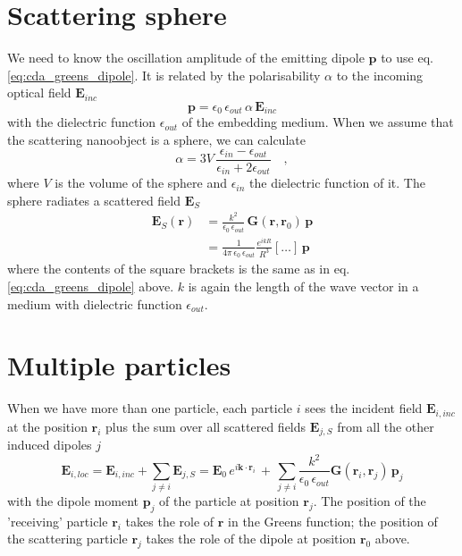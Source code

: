 \section{Scattering sphere}

We need to know the oscillation amplitude of the emitting dipole $\mathbf{p}$ to use eq. \ref{eq:cda_greens_dipole}. It is related by the  polarisability $\alpha$  to the incoming optical field $\mathbf{E}_{inc}$
\begin{equation}
\mathbf{p} = \epsilon_0 \, \epsilon_{out} \, \alpha \, \mathbf{E}_{inc}
\end{equation}
with the dielectric function $\epsilon_{out}$ of the embedding medium. 
When we assume that the scattering nanoobject is a sphere, we can calculate
\begin{equation}
 \alpha = 3V \, \frac{\epsilon_{in} - \epsilon_{out}}{\epsilon_{in} + 2 \epsilon_{out}} \quad ,
\end{equation}
where $V$ is the volume of the sphere and  $\epsilon_{in}$ the dielectric function of it. 
The sphere  radiates a scattered field $\mathbf{E}_S$
\begin{align}
\mathbf{E}_S(\mathbf{r}) & =  \frac{k^2}{\epsilon_0 \, \epsilon_{out}} \, \mathbf{G}(\mathbf{r}, \mathbf{r}_0) \,  \mathbf{p} \\
 & =  \frac{1}{4 \pi \, \epsilon_0 \, \epsilon_{out}  }  \frac{e^{i k R} }{  R^3 } 
\left[  \dots \right] \, \mathbf{p}
\end{align}
where the contents of the square brackets is the same as in eq.\ref{eq:cda_greens_dipole} above. $k$ is again the length of the wave vector in a medium with dielectric function $\epsilon_{out}$.

\section{Multiple particles}

When we have more than one particle, each particle $i$ sees the incident field $\mathbf{E}_{i, inc}$ at the   position $\mathbf{r}_i$ plus the sum over all scattered fields $\mathbf{E}_{j, S}$ from all the other induced dipoles $j$
\begin{equation}
\mathbf{E}_{i, loc} = \mathbf{E}_{i, inc} + \sum_{j \neq i} \mathbf{E}_{j, S}
 = \mathbf{E}_{0} \, e^{i \mathbf{k} \cdot \mathbf{r}_i} \, +  \, 
 \sum_{j \neq i} \frac{k^2}{\epsilon_0 \, \epsilon_{out}} 
 \mathbf{G}(\mathbf{r}_i, \mathbf{r}_j) \,  \mathbf{p}_j  \label{eq:cda_elocal}
\end{equation}
with the dipole moment $ \mathbf{p}_j$ of the particle at position $\mathbf{r}_j$. The position of the 'receiving' particle $\mathbf{r}_i$ takes the role of $\mathbf{r}$ in the Greens function; the position of the scattering particle $\mathbf{r}_j$ takes the role of the dipole at position $\mathbf{r}_0$ above.

